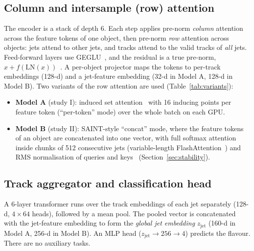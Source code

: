 \documentclass[11pt,a4paper]{article}
\begin{document}
\subsection{Column and intersample (row) attention}
The encoder is a stack of depth 6. Each step applies pre-norm \emph{column} attention
across the feature tokens of one object, then pre-norm \emph{row} attention across
objects: jets attend to other jets, and tracks attend to the valid tracks of
\emph{all} jets. Feed-forward layers use GEGLU~\citep{Shazeer2020GLU}, and the residual
is a true pre-norm, $x+f(\mathrm{LN}(x))$~\citep{Xiong2020PreLN}. A per-object projector
maps the tokens to per-track embeddings (128-d) and a jet-feature embedding (32-d in
Model A, 128-d in Model B).
Two variants of the row attention are used (Table~\ref{tab:variants}):
\begin{itemize}
  \item \textbf{Model A} (study I): induced set attention~\citep{lee2019settransformerframeworkattentionbased}
        with 16 inducing points per feature token (``per-token'' mode) over the whole
        batch on each GPU.
  \item \textbf{Model B} (study II): SAINT-style ``concat'' mode, where the feature tokens
        of an object are concatenated into one vector, with full softmax attention inside
        chunks of 512 consecutive jets (variable-length FlashAttention~\citep{Dao2024FlashAttention2})
        and RMS normalisation of queries and keys~\citep{Henry2020QKNorm,Zhang2019RMSNorm}
        (Section~\ref{sec:stability}).
\end{itemize}

\subsection{Track aggregator and classification head}
A 6-layer transformer runs over the track embeddings of each jet separately (128-d,
$4\times64$ heads), followed by a mean pool. The pooled vector is concatenated with the
jet-feature embedding to form the \emph{global jet embedding} $z_{\mathrm{jet}}$ (160-d in
Model A, 256-d in Model B). An MLP head ($z_{\mathrm{jet}}\to256\to4$) predicts the
flavour. There are no auxiliary tasks.
\end{document}
